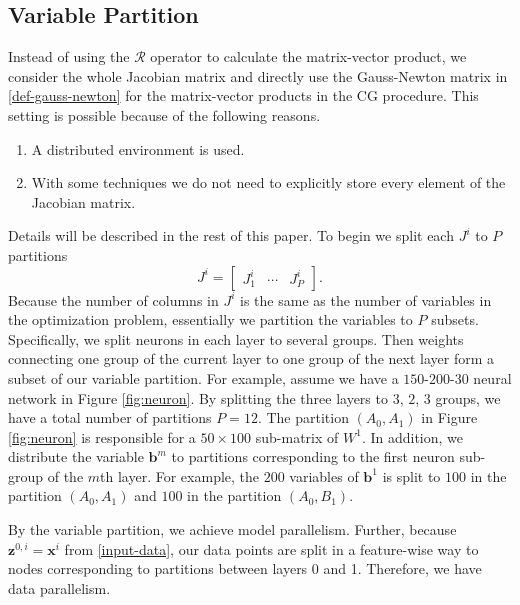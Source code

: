 \documentclass[12pt]{article}
\def\bx{{\boldsymbol x}}
\def\bb{{\boldsymbol b}}
\def\bz{{\boldsymbol z}}
\begin{document}
\subsection{Variable Partition}
\label{subsec:Variable}
Instead of using the $\mathcal R$ operator to calculate the matrix-vector product, we consider the whole Jacobian matrix and
directly use the Gauss-Newton matrix in \eqref{def-gauss-newton} for the matrix-vector products in the CG procedure. 
This setting is possible because of the following reasons.
\begin{enumerate}[1.]
\item A distributed environment is used.
\item With some techniques we do not need to explicitly store every element of the Jacobian matrix.
\end{enumerate}
Details will be described in the rest of this paper.
To begin we split each $J^i$ to $P$ partitions
\begin{equation*}
	J^i = \begin{bmatrix} J^i_1 & \cdots & J^i_P\end{bmatrix}.
\end{equation*}
Because the number of columns in $J^i$ is the same as the number of variables in the optimization problem,
essentially we partition the variables to $P$ subsets. Specifically, we split neurons in each layer to several groups.
Then weights connecting one group of the current layer to one group of the next layer form a subset of our variable partition.
For example, assume we have a $150$-$200$-$30$ neural network in Figure \ref{fig:neuron}. By splitting the three layers to $3$, $2$, $3$ groups,
we have a total number of partitions $P = 12$. The partition $(A_0,A_1)$ in Figure \ref{fig:neuron} is responsible for a $50\times100$ sub-matrix of $W^1$. 
In addition, we distribute the variable $\bb^m$ to partitions corresponding to the first neuron sub-group of the $m$th layer.
For example, the $200$ variables of $\bb^1$ is split to $100$ in the partition $(A_0,A_1)$ and $100$ in the partition $(A_0,B_1)$.
\par By the variable partition, we achieve model parallelism. Further, because $\bz^{0,i} = \bx^{i}$ from \eqref{input-data}, our data points are split in a feature-wise way to nodes corresponding to partitions between layers 0 and 1. Therefore, we have data parallelism.
\end{document}
